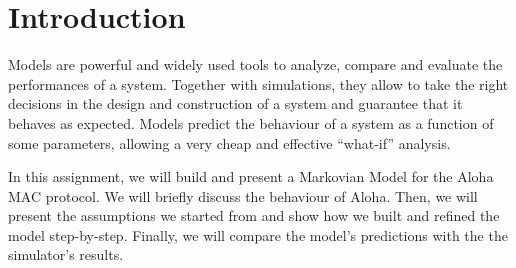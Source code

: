 \section{Introduction}
\label{sec:introduction}

Models are powerful and widely used tools to analyze, compare and evaluate the performances of a system.
Together with simulations, they allow to take the right decisions in the design and construction of a system and guarantee that it behaves as expected.
Models predict the behaviour of a system as a function of some parameters, allowing a very cheap and effective ``what-if'' analysis.

In this assignment, we will build and present a Markovian Model for the Aloha \ac{MAC} protocol.
We will briefly discuss the behaviour of Aloha.
Then, we will present the assumptions we started from and show how we built and refined the model step-by-step.
Finally, we will compare the model's predictions with the the simulator's results.
